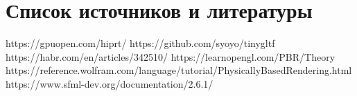 \documentclass[a4paper,14pt]{extarticle}
\begin{document}
\begin{center}
\begin{longtable}{c c}
    \\
\end{longtable}

\end{center}

\newpage


\section{Список источников и литературы}

https://gpuopen.com/hiprt/
https://github.com/syoyo/tinygltf
https://habr.com/en/articles/342510/
https://learnopengl.com/PBR/Theory
https://reference.wolfram.com/language/tutorial/PhysicallyBasedRendering.html
https://www.sfml-dev.org/documentation/2.6.1/
\end{document}
